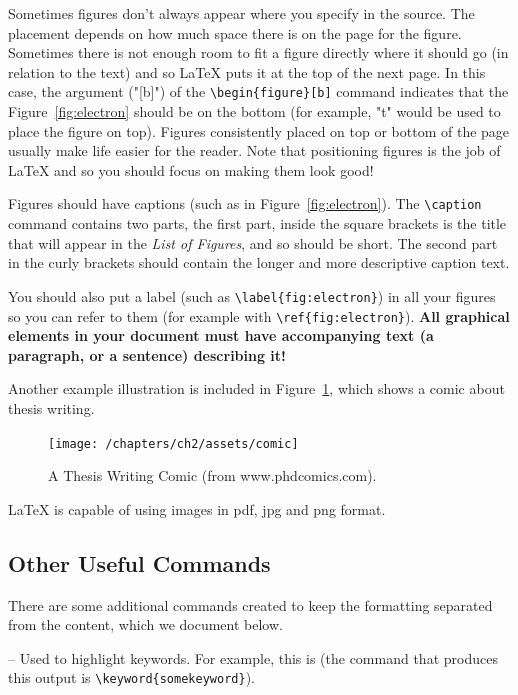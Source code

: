 Sometimes figures don't always appear where you specify in the source. The placement depends on how much space there is on the page for the figure. Sometimes there is not enough room to fit a figure directly where it should go (in relation to the text) and so \LaTeX{} puts it at the top of the next page. In this case, the argument ("[b]") of the \verb|\begin{figure}[b]| command indicates that the Figure~\ref{fig:electron} should be on the bottom (for example, "t" would be used to place the figure on top). Figures consistently placed on top or bottom of the page usually make life easier for the reader. Note that positioning figures is the job of \LaTeX{} and so you should focus on making them look good! 

Figures should have captions (such as in Figure~\ref{fig:electron}). The \verb|\caption| command contains two parts, the first part, inside the square brackets is the title that will appear in the \emph{List of Figures}, and so should be short. The second part in the curly brackets should contain the longer and more descriptive caption text. 

You should also put a label (such as \verb|\label{fig:electron}|) in all your figures so you can refer to them (for example with \verb|\ref{fig:electron}|). {\bf All graphical elements in your document must have accompanying text (a paragraph, or a sentence) describing it!}

Another example illustration is included in Figure~\ref{fig:comic}, which shows a comic about thesis writing.

\begin{figure}[t]
\centering
\texttt{[image: /chapters/ch2/assets/comic]}
\caption[Thesis Writing Comic]{A Thesis Writing Comic (from www.phdcomics.com).}
\label{fig:comic}
\end{figure}

\LaTeX{} is capable of using images in pdf, jpg and png format.

\subsection{Other Useful Commands}

There are some additional commands created to keep the formatting separated from the content, which we document below.

 -- Used to highlight keywords. For example, this is  (the command that produces this output is \verb|\keyword{somekeyword}|).

